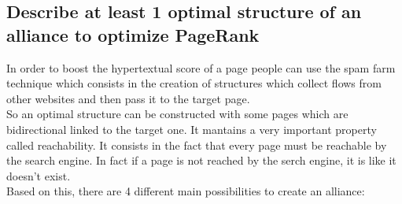\subsection{Describe at least 1 optimal structure of an
alliance to optimize PageRank}
In order to boost the hypertextual score of a page people can use the
spam farm technique which consists in the creation of structures which
collect flows from other websites and then pass it to the target page.\\
So an optimal structure can be constructed with some pages which are
bidirectional linked to the target one. It mantains a
very important property called reachability. It consists in the fact that
every page must be reachable by the search engine. In fact if a page is
not reached by the serch engine, it is like it doesn't exist.\\
Based on this, there are 4 different main possibilities to create an
alliance:
